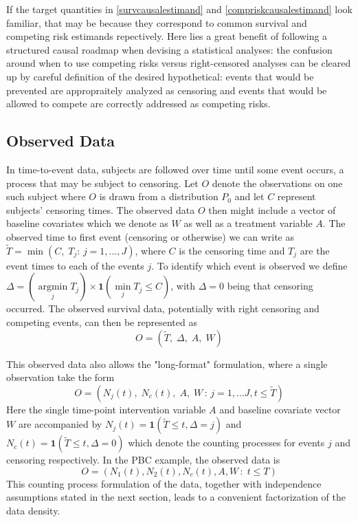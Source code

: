 \documentclass{report}
\DeclareMathOperator*{\argmin}{argmin}
\newcommand{\1}{\ensuremath{\mathbf{1}}}
\newcommand{\T}{\ensuremath{\widetilde{T}}}
\renewcommand{\L}{\ensuremath{W}}
\begin{document}
If the target quantities in \eqref{survcausalestimand} and \eqref{compriskcausalestimand} look familiar, that may be because they correspond to common survival and competing risk estimands repectively. Here lies a great benefit of following a structured causal roadmap when devising a statistical analyses: the confusion around when to use competing risks versus right-censored analyses can be cleared up by careful definition of the desired hypothetical: events that would be prevented are appropraitely analyzed as censoring and events that would be allowed to compete are correctly addressed as competing risks.

\subsection{Observed Data}
\label{sec:orgc2ea9ed}
In time-to-event data, subjects are followed over time until some event occurs, a process that may be subject to censoring. Let \(O\) denote the observations on one such subject where \(O\) is drawn from a distribution \(P_0\) and let \(C\) represent subjects' censoring times. The observed data \(O\) then might include a vector of baseline covariates which we denote as \(\L\) as well as a treatment variable \(A\). The observed time to first event (censoring or otherwise) we can write as \(\T = \min(C,\; T_j :\, j = 1, \dots, J)\), where \(C\) is the censoring time and \(T_j\) are the event times to each of the events \(j\). To identify which event is observed we define \(\Delta = (\argmin\limits_j T_j) \times \1(\min\limits_j T_j \leq C)\), with \(\Delta = 0\) being that censoring occurred. The observed survival data, potentially with right censoring and competing events, can then be represented as 
\[O = (\T,\;\Delta,\;A,\;\L)\]

This observed data also allows the "long-format" formulation, where a single observation take the form
\[O = (N_j(t),\;N_c(t),\;A,\;\L\,:\, j = 1, \dots J, t \leq \T)\]
Here the single time-point intervention variable \(A\) and baseline covariate vector \(\L\) are accompanied by \(N_j(t) = \1(\T \leq t, \Delta = j)\) and \(N_c(t) = \1(\T \leq t, \Delta = 0)\) which denote the counting processes for events \(j\) and censoring respectively. In the PBC example, the observed data is
\[ O = \left(N_1(t), N_2(t), N_c(t), A, \L \,:\; t \leq T\right) \]
This counting process formulation of the data, together with independence assumptions stated in the next section, leads to a convenient factorization of the data density. 
\end{document}
